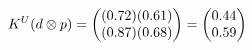 \documentclass[preview]{standalone}
\begin{document}
\begin{align*}
\special{dvisvgm:raw <g id='unique000'>}K^U(d \otimes p) = \begin{pmatrix} (0.72)(0.61) \\ (0.87)(0.68) \end{pmatrix} = \begin{pmatrix} 0.44 \\ 0.59 \end{pmatrix}\special{dvisvgm:raw </g>}
\end{align*}
\end{document}
